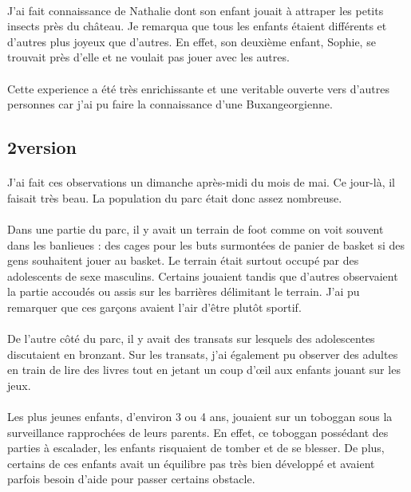 \paragraph{}
J’ai fait connaissance de Nathalie dont son enfant jouait à
attraper les petits insects près du château. Je remarqua que
tous les enfants étaient différents et d’autres plus joyeux que
d’autres. En effet, son deuxième enfant, Sophie, se trouvait
près d’elle et ne voulait pas jouer avec les autres.
\paragraph{}
Cette experience a été très enrichissante et une veritable
ouverte vers d’autres personnes car j’ai pu faire la
connaissance d’une Buxangeorgienne.

\subsection{2\ieme version}
\paragraph{}
J’ai fait ces observations un dimanche après-midi du mois de mai. Ce jour-là, il faisait très beau. La population du parc était donc assez nombreuse.
\paragraph{}
Dans une partie du parc, il y avait un terrain de foot comme on voit souvent dans les banlieues : des cages pour les buts surmontées de panier de basket si des gens souhaitent jouer au basket. Le terrain était surtout occupé par des adolescents de sexe masculins. Certains jouaient tandis que d’autres observaient la partie accoudés ou assis sur les barrières délimitant le terrain. J’ai pu remarquer que ces garçons avaient l’air d’être plutôt sportif.
\paragraph{}
De l’autre côté du parc, il y avait des transats sur lesquels des adolescentes discutaient en bronzant. Sur les transats, j’ai également pu  observer des adultes en train de lire des livres tout en jetant un coup d’œil aux enfants jouant sur les jeux. 
\paragraph{}
Les plus jeunes enfants, d’environ 3 ou 4 ans, jouaient sur un toboggan sous la surveillance rapprochées de leurs parents. En effet, ce toboggan possédant des parties à escalader, les enfants risquaient de tomber et de se blesser. De plus, certains de ces enfants avait un équilibre pas très bien développé et avaient parfois besoin d’aide pour passer certains obstacle.

